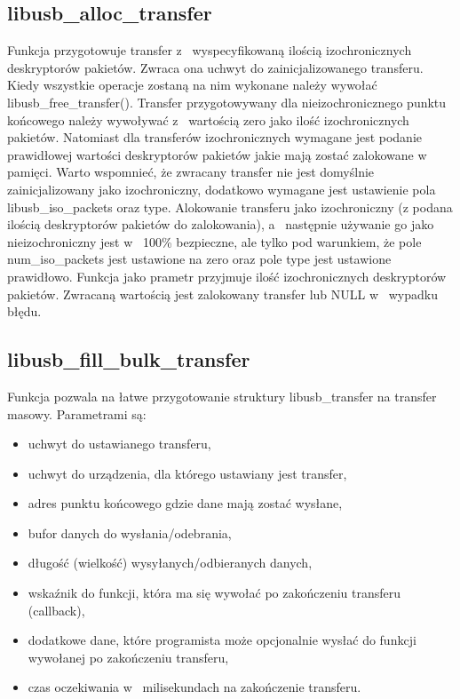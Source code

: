 \documentclass{BscUS}
\begin{document}
\subsection{libusb\_alloc\_transfer}
\indent Funkcja przygotowuje transfer z~ wyspecyfikowaną ilością 	izochronicznych deskryptorów pakietów.
Zwraca ona uchwyt do zainicjalizowanego transferu. Kiedy wszystkie operacje zostaną na nim wykonane należy wywołać libusb\_free\_transfer().
Transfer przygotowywany dla nieizochronicznego punktu końcowego należy wywoływać z~ wartością zero jako ilość izochronicznych pakietów.
Natomiast dla transferów izochronicznych wymagane jest podanie prawidłowej wartości deskryptorów pakietów jakie mają zostać zalokowane w~ pamięci. Warto wspomnieć, że zwracany transfer nie jest domyślnie zainicjalizowany jako izochroniczny, dodatkowo wymagane jest ustawienie pola libusb\_iso\_packets oraz type.
Alokowanie transferu jako izochroniczny (z podana ilością deskryptorów pakietów do zalokowania), a~ następnie używanie go jako nieizochroniczny jest w~ 100\% bezpieczne, ale tylko pod warunkiem, że pole num\_iso\_packets jest ustawione na zero oraz pole type jest ustawione prawidłowo.
Funkcja jako prametr przyjmuje ilość izochronicznych deskryptorów pakietów.
Zwracaną wartością jest zalokowany transfer lub NULL w~ wypadku błędu.
\subsection{libusb\_fill\_bulk\_transfer}
\indent Funkcja pozwala na łatwe przygotowanie struktury libusb\_transfer na transfer masowy.
\newline
Parametrami są:
\begin{itemize}
\item uchwyt do ustawianego transferu,
\item uchwyt do urządzenia, dla którego ustawiany jest transfer,
\item adres punktu końcowego gdzie dane mają zostać wysłane,
\item bufor danych do wysłania/odebrania,
\item długość (wielkość) wysyłanych/odbieranych danych,
\item wskaźnik do funkcji, która ma się wywołać po zakończeniu transferu (callback),
\item dodatkowe dane, które programista może opcjonalnie wysłać do funkcji wywołanej po zakończeniu transferu,
\item czas oczekiwania w~ milisekundach na zakończenie transferu.
\end{itemize}
\end{document}
